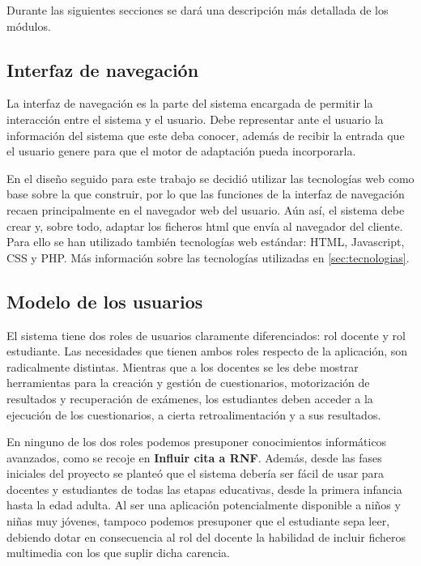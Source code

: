 Durante las siguientes secciones se dará una descripción más detallada de los módulos.

\subsection{Interfaz de navegación}

La interfaz de navegación es la parte del sistema encargada de permitir la interacción entre el sistema y el usuario. Debe representar ante el usuario la información del sistema que este deba conocer, además de recibir la entrada que el usuario genere para que el motor de adaptación pueda incorporarla.

En el diseño seguido para este trabajo se decidió utilizar las tecnologías web como base sobre la que construir, por lo que las funciones de la interfaz de navegación recaen principalmente en el navegador web del usuario. Aún así, el sistema debe crear y, sobre todo, adaptar los ficheros html que envía al navegador del cliente. Para ello se han utilizado también tecnologías web estándar: HTML, Javascript, CSS y PHP. Más información sobre las tecnologías utilizadas en \ref{sec:tecnologias}.

\subsection{Modelo de los usuarios}


El sistema tiene dos roles de usuarios claramente diferenciados: rol docente y rol estudiante. Las necesidades que tienen ambos roles respecto de la aplicación, son radicalmente distintas. Mientras que a los docentes se les debe mostrar herramientas para la creación y gestión de cuestionarios, motorización de resultados y recuperación de exámenes, los estudiantes deben acceder a la ejecución de los cuestionarios, a cierta retroalimentación y a sus resultados.

En ninguno de los dos roles podemos presuponer conocimientos informáticos avanzados, como se recoje en \textbf{Influir cita a RNF}. Además, desde las fases iniciales del proyecto se planteó que el sistema debería ser fácil de usar para docentes y estudiantes de todas las etapas educativas, desde la primera infancia hasta la edad adulta. Al ser una aplicación potencialmente disponible a niños y niñas muy jóvenes, tampoco podemos presuponer que el estudiante sepa leer, debiendo dotar en consecuencia al rol del docente la habilidad de incluir ficheros multimedia con los que suplir dicha carencia.

